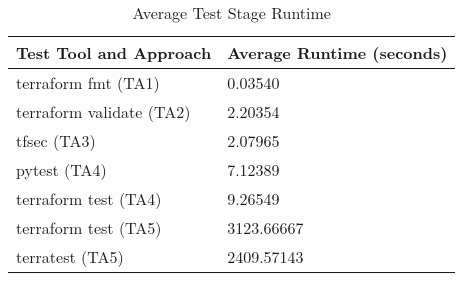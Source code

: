\begin{table}[h!]
\begin{tabular}{|l | l|}
\hline
\textbf{Test Tool and Approach} & \textbf{Average Runtime (seconds)} \\
\hline
terraform fmt (TA1) & 0.03540 \\
\hline
terraform validate (TA2) & 2.20354 \\
\hline
tfsec (TA3) & 2.07965 \\
\hline
pytest (TA4) & 7.12389 \\
\hline
terraform test (TA4) & 9.26549 \\
\hline
terraform test (TA5) & 3123.66667 \\
\hline
terratest (TA5) & 2409.57143 \\
\hline
\end{tabular}
\caption{Average Test Stage Runtime}
\label{tab:avg_runtime_stage}
\end{table}
